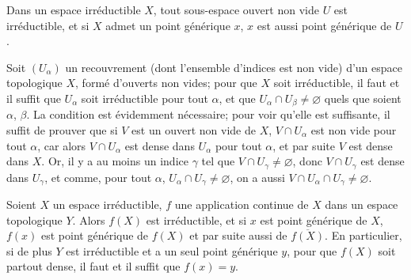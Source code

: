 \begin{env}[2.1.4]
\label{0.2.1.4-fr}
Dans un espace irréductible $X$, tout sous-espace ouvert non vide $U$ est
irréductible, et si $X$ admet un point générique $x$, $x$ est aussi point
générique de $U$.

Soit $(U_\alpha)$ un recouvrement (dont l'ensemble d'indices est non vide) d'un
espace topologique $X$, formé d'ouverts non vides; pour que $X$ soit
irréductible, il faut et il suffit que $U_\alpha$ soit irréductible pour tout
$\alpha$, et que $U_\alpha\cap U_\beta\neq\varnothing$ quels que soient
$\alpha$, $\beta$. La condition est évidemment nécessaire; pour voir qu'elle
est suffisante, il suffit de prouver que si $V$ est un ouvert non vide de $X$,
$V\cap U_\alpha$ est non vide pour tout $\alpha$, car alors $V\cap U_\alpha$
est dense dans $U_\alpha$ pour tout $\alpha$, et par suite $V$ est dense dans
$X$. Or, il y a au moins un indice $\gamma$ tel que
$V\cap U_\gamma\neq\varnothing$, donc $V\cap U_\gamma$ est dense dans
$U_\gamma$, et comme, pour tout $\alpha$,
$U_\alpha\cap U_\gamma\neq\varnothing$, on a aussi
$V\cap U_\alpha\cap U_\gamma\neq\varnothing$.
\end{env}


\begin{env}[2.1.5]
\label{0.2.1.5-fr}
Soient $X$ un espace irréductible, $f$ une application continue de $X$ dans un
espace topologique $Y$. Alors $f(X)$ est irréductible, et si $x$ est point
générique de $X$, $f(x)$ est point générique de $f(X)$ et par suite aussi de
$\overline{f(X)}$. En particulier, si de plus $Y$ est irréductible et a un seul
point générique $y$, pour que $f(X)$ soit partout dense, il faut et il suffit
que $f(x)=y$.
\end{env}

